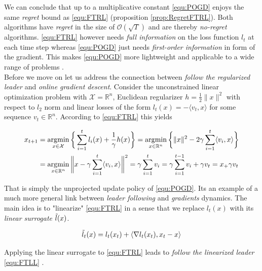 We can conclude that up to a multiplicative constant \ref{equ:POGD} enjoys the same \textit{regret} bound as \ref{equ:FTRL} (proposition \ref{prop:RegretFTRL}). Both algorithms have \textit{regret} in the size of $\mathcal{O}(\sqrt{T})$ and are thereby \textit{no-regret} algorithms. \ref{equ:FTRL} however needs \textit{full information} on the loss function $l_t$ at each time step whereas \ref{equ:POGD} just needs \textit{first-order information} in form of the gradient. This makes \ref{equ:POGD} more lightweight and applicable to a wide range of problems \cite{HDRmertikopoulos}. \\

Before we move on let us address the connection between \textit{follow the regularized leader} and \textit{online gradient descent}. Consider the unconstrained linear optimization problem with $\mathcal{X} = \mathbb{R}^n$, Euclidean regularizer $h = \frac{1}{2}\|x\|^2$ with respect to $l_2$ norm and linear losses of the form $l_t(x) = -\langle v_t,x\rangle$ for some sequence $v_t \in \mathbb{R}^n$. According to \ref{equ:FTRL} this yields

\begin{equation*}
    \begin{split}
        x_{t+1} & = \operatorname*{\arg\!\min}_{x \in \mathcal{X}} \bigg\{\sum_{i=1}^t l_i(x) + \frac{1}{\gamma}h(x)\bigg\} = \operatorname*{\arg\!\min}_{x \in \mathbb{R}^n} \bigg\{\|x\|^2 - 2\gamma\sum_{i=1}^t \langle v_i,x\rangle\bigg\} \\
        & = \operatorname*{\arg\!\min}_{x \in \mathbb{R}^n} \bigg\|x - \gamma\sum_{i=1}^t \langle v_i,x\rangle\bigg\|^2 = \gamma\sum_{i=1}^t v_i = \gamma\sum_{i=1}^{t-1} v_i + \gamma v_t = x_ + \gamma v_t
    \end{split}
\end{equation*}

That is simply the unprojected update policy of \ref{equ:POGD}. Its an example of a much more general link between \textit{leader following} and \textit{gradients} dynamics. The main idea is to "linearize" \ref{equ:FTRL} in a sense that we replace $l_t(x)$ with its \textit{linear surrogate} $\Tilde{l}(x)$.

\begin{equation*}
    \Tilde{l}_t(x) = l_t(x_t) + \langle \nabla l_t(x_t),x_t-x \rangle
\end{equation*}

Applying the linear surrogate to \ref{equ:FTRL} leads to \textit{follow the linearized leader} \ref{equ:FTLL} \cite{HDRmertikopoulos}. 

